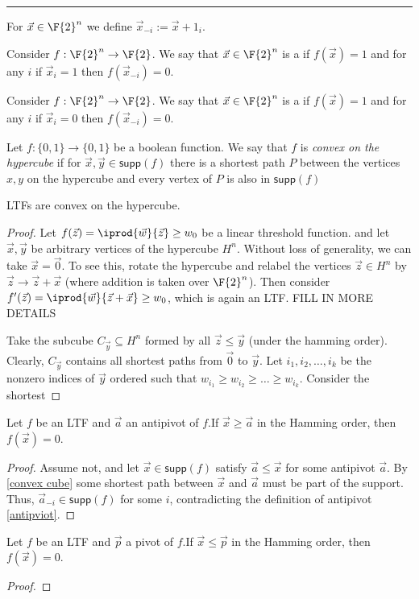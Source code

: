 \hrule
For $\vec{x}\in\F{2}^n$ we define $\vec{x}_{-i} := \vec{x} + 1_i$. 
\begin{definition}\label{pivot}
	Consider $f : \F{2}^n \to \F{2}$. We say that $\vec{x}\in \F{2}^n$ is a  if $f(\vec{x}) = 1$ and for any $i$ if $\vec{x}_i = 1$ then $f(\vec{x}_{-i}) = 0$.
\end{definition}
\begin{definition}\label{antipviot}
	Consider $f : \F{2}^n \to \F{2}$. We say that $\vec{x}\in \F{2}^n$ is a  if $f(\vec{x}) = 1$ and for any $i$ if $\vec{x}_i = 0$ then $f(\vec{x}_{-i}) = 0$.
\end{definition}
\begin{definition}\label{convex cube}
	Let $f : \{0,1\}\to\{0,1\}$ be a boolean function. We say that $f$ is \textit{convex on the hypercube} if for $\vec{x},\vec{y}\in \mathsf{supp}(f)$ there is a shortest path $P$ between the vertices $x,y$ on the hypercube and every vertex of $P$ is also in $\mathsf{supp}(f)$
\end{definition}
\begin{lemma}
	LTFs are convex on the hypercube.
\end{lemma}
\begin{proof}
	Let $f(\vec{z}) = \iprod{\vec{w}}{\vec{z}} \geq w_0$ be a linear threshold function. and let $\vec{x},\vec{y}$ be arbitrary vertices of the hypercube $H^n$. Without loss of generality, we can take $\vec{x} = \vec{0}$. To see this, rotate the hypercube and relabel the vertices $\vec{z}\in H^n$ by $\vec{z}\to \vec{z} + \vec{x}$ (where addition is taken over $\F{2}^n$). Then consider $f'(\vec{z}) = \iprod{\vec{w}}{\vec{z} + \vec{x}} \geq w_0$, which is again an LTF. FILL IN MORE DETAILS
	
	Take the subcube $C_{\vec{y}} \subseteq H^n$ formed by all $\vec{z} \leq \vec{y}$ (under the hamming order). Clearly, $C_{\vec{y}}$ contains all shortest paths from $\vec{0}$ to $\vec{y}$. Let $i_1,i_2,\dots,i_k$ be the nonzero indices of $\vec{y}$ ordered such that $w_{i_1} \geq w_{i_2} \geq \dots \geq w_{i_k}$. Consider the shortest 
	
	
\end{proof}
\begin{lemma}\label{leave support}
	Let $f$ be an LTF and $\vec{a}$ an antipivot of $f$.If $\vec{x} \geq \vec{a}$ in the Hamming order, then $f(\vec{x}) = 0$.
\end{lemma}
\begin{proof}
	Assume not, and let $\vec{x}\in \mathsf{supp}(f)$ satisfy $\vec{a} \leq \vec{x}$ for some antipivot $\vec{a}$. By \ref{convex cube} some shortest path between $\vec{x}$ and $\vec{a}$ must be part of the support. Thus, $\vec{a}_{-i}\in\mathsf{supp}(f)$ for some $i$, contradicting the definition of antipivot \ref{antipviot}. 
\end{proof}
\begin{lemma}\label{enter support}
	Let $f$ be an LTF and $\vec{p}$ a pivot of $f$.If $\vec{x} \leq \vec{p}$ in the Hamming order, then $f(\vec{x}) = 0$.
\end{lemma}
\begin{proof}
	
\end{proof}


